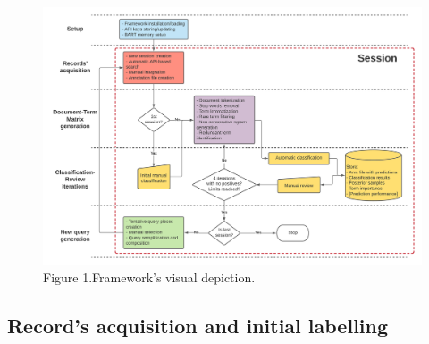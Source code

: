 \documentclass{article}
\begin{document}
\begin{figure}
\includegraphics[width=1\linewidth]{methods_diagram} \caption{Figure 1.Framework's visual depiction.}\label{fig:method_diagram}
\end{figure}

\hypertarget{records-acquisition-and-initial-labelling}{%
\subsection{Record's acquisition and initial
labelling}\label{records-acquisition-and-initial-labelling}}
\end{document}
